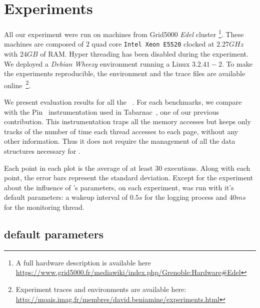\section{Experiments}
\label{sec:expe}

\label{sec:exp-methodo}


All our experiment were run on  machines from Grid5000 \emph{Edel} cluster
\footnote{A full hardware description is available here\\
    \url{https://www.grid5000.fr/mediawiki/index.php/Grenoble:Hardware\#Edel}}.
    These machines are composed of $2$ quad core \texttt{Intel Xeon E5520}
    clocked at $2.27GHz$ with
    $24 GB$ of RAM. Hyper threading has been disabled during the experiment.
We deployed a \emph{Debian} \emph{Wheezy} environment running a Linux $3.2.41-2$.
To make the experiments reproducible, the environment and the trace files are
available
online~\footnote{Experiment traces and environments are available here:\\ \url{http://moais.imag.fr/membres/david.beniamine/experiments.html}}.

We present evaluation results for all the \NPB~\cite{Jin1999}. For
each benchmarks, we compare \Moca with the Pin~\cite{Luk05Pin} instrumentation
used in Tabarnac~\cite{Beniamine15TABARNACRR}, one of our previous contribution. This instrumentation traps all the
memory accesses but keeps only tracks of the number of time each thread accesses to
each page, without any other information. Thus it does not require the management
of all the data structures necessary for \Moca.

Each point in each plot is the average of at least $30$ executions. Along with each point,
the error bars represent the standard deviation.
Except for the experiment about the influence of \Moca's parameters, on each
experiment, \Moca was run with it's default parameters: a wakeup interval of
$0.5s$ for the logging process and $40ms$ for the monitoring thread.

\subsection{\Moca default parameters}
\label{sec:expe-ovh}

